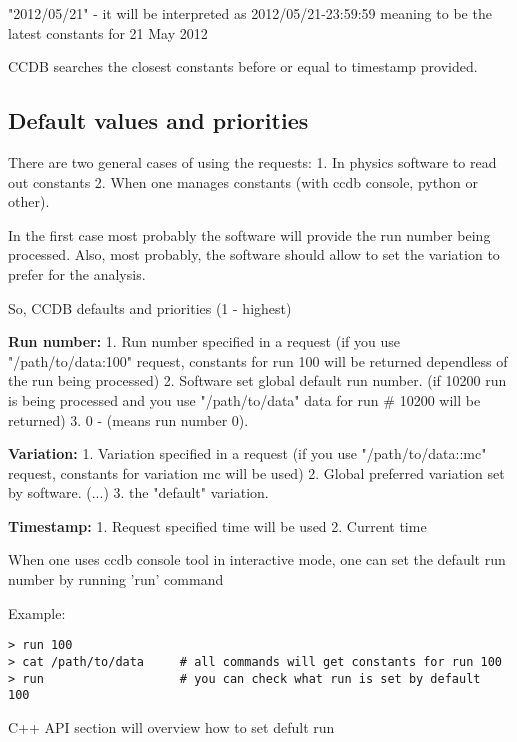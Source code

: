 \documentclass{article}
\begin{document}
"2012/05/21" - it will be interpreted as 2012/05/21-23:59:59 meaning to be the latest
constants for 21 May 2012

CCDB searches the closest constants before or equal to timestamp provided.


\subsection{Default values and priorities}

There are two general cases of using the requests:
1. In physics software to read out constants
2. When one manages constants (with ccdb console, python or other).

In the first case most probably the software will provide the run number being processed.
Also, most probably, the software should allow to set the variation to prefer for the analysis.

So, CCDB defaults and priorities (1 - highest)

\textbf{Run number:}
1. Run number specified in a request
(if you use "/path/to/data:100" request, constants for run 100 will be returned dependless of the run being processed)
2. Software set global default run number.
(if 10200 run is being processed and you use "/path/to/data" data for run \# 10200 will be returned)
3. 0 - (means run number 0).

\textbf{Variation:}
1. Variation specified in a request
(if you use "/path/to/data::mc" request, constants for variation mc will be used)
2. Global preferred variation set by software.
(...)
3. the "default" variation.


\textbf{Timestamp:}
1. Request specified time will be used
2. Current time


When one uses ccdb console tool in interactive mode, one can set the default run number by running 'run' command

Example:
\begin{verbatim}
> run 100
> cat /path/to/data     # all commands will get constants for run 100
> run                   # you can check what run is set by default
100
\end{verbatim}
C++ API section will overview how to set defult run


\end{document}
